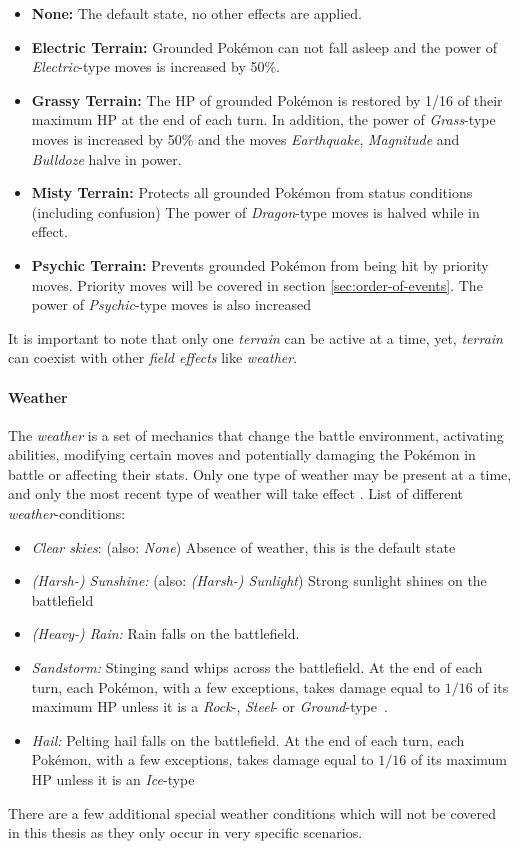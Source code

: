 \begin{itemize}
	\item \textbf{None:} The default state, no other effects are applied. 
	\item \textbf{Electric Terrain:} Grounded Pokémon can not fall asleep and the power of \textit{Electric}-type
		moves is increased by 50\%.
	\item \textbf{Grassy Terrain:} The HP of grounded Pokémon is restored by 1/16 of their maximum HP at the
		end of each turn. In addition, the power of \textit{Grass}-type moves is increased by 50\% and the 
		moves \textit{Earthquake}, \textit{Magnitude} and \textit{Bulldoze} halve in power. 
	\item \textbf{Misty Terrain:} Protects all grounded Pokémon from status conditions (including confusion)
		The power of \textit{Dragon}-type moves is halved while in effect. 
	\item \textbf{Psychic Terrain:} Prevents grounded Pokémon from being hit by priority moves. Priority
	moves will be covered in section \ref{sec:order-of-events}. The power of \textit{Psychic}-type moves is also increased
\end{itemize}
It is important to note that only one \textit{terrain} can be active at a time, yet, \textit{terrain}
can coexist with other \textit{field effects} like \textit{weather}.

\paragraph{Weather}
The \textit{weather} is a set of mechanics that change the battle environment, activating abilities, modifying
certain moves and potentially damaging the Pokémon in battle or affecting their stats. Only one type of weather may 
be present at a time, and only the most recent type of weather will take effect \cite{Bulbapedia:Weather}. List
of different \textit{weather}-conditions:
\begin{itemize}
	\item \textit{Clear skies}: (also: \emph{None}) Absence of weather, this is the default state
	\item \textit{(Harsh-) Sunshine:} (also: \emph{(Harsh-) Sunlight}) Strong sunlight shines on the 
	battlefield
	\item \textit{(Heavy-) Rain:} Rain falls on the battlefield.
	\item \textit{Sandstorm:} Stinging sand whips across the battlefield. At the end of each turn, each
	Pokémon, with a few exceptions, takes damage equal to $1/16$ of its maximum \ac{HP} unless it is 
	a \textit{Rock}-, \textit{Steel}- or
	\textit{Ground}-type~\autocite{Bulbapedia:SandstormWeather}.
	\item \textit{Hail:} Pelting hail falls on the battlefield. At the end of each turn, each
	Pokémon, with a few exceptions, takes damage equal to $1/16$ of its maximum \ac{HP} unless it is an 
	\textit{Ice}-type~\autocite{Bulbapedia:HailWeather}
\end{itemize}
There are a few additional special weather conditions which will not be covered in this thesis as they only occur in 
very specific scenarios.


